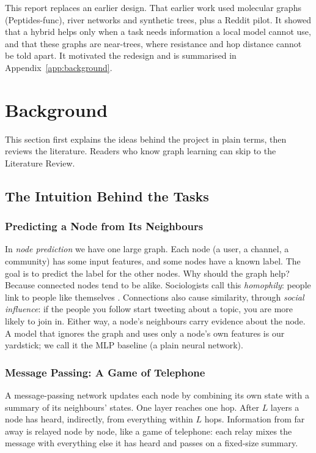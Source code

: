 This report replaces an earlier design. That earlier work used molecular graphs (Peptides-func), river networks and synthetic trees, plus a Reddit pilot. It showed that a hybrid helps only when a task needs information a local model cannot use, and that these graphs are near-trees, where resistance and hop distance cannot be told apart. It motivated the redesign and is summarised in Appendix~\ref{app:background}.

\section{Background}
This section first explains the ideas behind the project in plain terms, then reviews the literature. Readers who know graph learning can skip to the Literature Review.

\subsection{The Intuition Behind the Tasks}

\subsubsection{Predicting a Node from Its Neighbours}
In \emph{node prediction} we have one large graph. Each node (a user, a channel, a community) has some input features, and some nodes have a known label. The goal is to predict the label for the other nodes. Why should the graph help? Because connected nodes tend to be alike. Sociologists call this \emph{homophily}: people link to people like themselves \citep{f_mcpherson2001}. Connections also cause similarity, through \emph{social influence}: if the people you follow start tweeting about a topic, you are more likely to join in. Either way, a node's neighbours carry evidence about the node. A model that ignores the graph and uses only a node's own features is our yardstick; we call it the MLP baseline (a plain neural network).

\subsubsection{Message Passing: A Game of Telephone}
A message-passing network \citep{gilmer2017} updates each node by combining its own state with a summary of its neighbours' states. One layer reaches one hop. After $L$ layers a node has heard, indirectly, from everything within $L$ hops. Information from far away is relayed node by node, like a game of telephone: each relay mixes the message with everything else it has heard and passes on a fixed-size summary.

